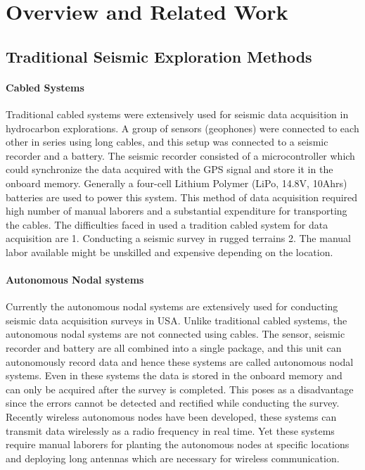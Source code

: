 \section{Overview and Related Work}\label{sec:RelatedWork}


\subsection{Traditional Seismic Exploration Methods}




 \paragraph{Cabled Systems}

 Traditional cabled systems were extensively used for seismic data acquisition in hydrocarbon explorations. A group of sensors (geophones) were connected to each other in series using long cables, and this setup was connected to a seismic recorder and a battery. The seismic recorder consisted of a microcontroller which could synchronize the data acquired with the GPS signal and store it in the onboard memory. Generally a four-cell Lithium Polymer (LiPo, 14.8V, 10Ahrs) batteries are used to power this system. This method of data acquisition required high number of manual laborers and a substantial expenditure for transporting the cables. The difficulties faced in used a tradition cabled system for data acquisition are 1. Conducting a seismic survey in rugged terrains 2. The manual labor available might be unskilled and expensive depending on the location.  
 
 \paragraph{Autonomous Nodal systems}
 
 Currently the autonomous nodal systems are extensively used for conducting seismic data acquisition surveys in USA. Unlike traditional cabled systems, the autonomous nodal systems are not connected using cables. The sensor, seismic recorder and battery are all combined into a single package, and this unit can autonomously record data and hence these systems are called autonomous nodal systems. Even in these systems the data is stored in the onboard memory and can only be acquired after the survey is completed. This poses as a disadvantage since the errors cannot be detected and rectified while conducting the survey. Recently wireless autonomous nodes have been developed, these systems can transmit data wirelessly as a radio frequency in real time. Yet these systems require manual laborers for planting the autonomous nodes at specific locations and deploying long antennas which are necessary for wireless communication.
 
